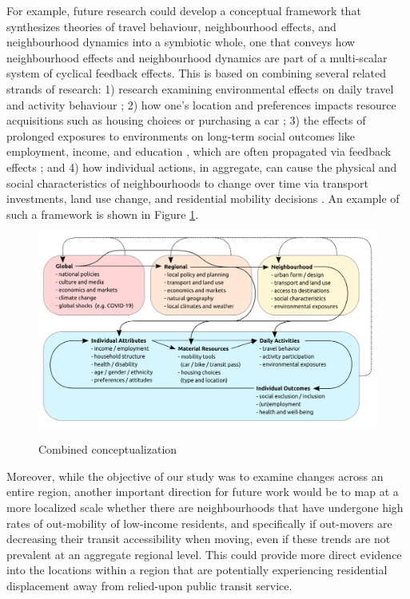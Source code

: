 For example, future research could develop a conceptual framework that synthesizes theories of travel behaviour, neighbourhood effects, and neighbourhood dynamics into a symbiotic whole, one that conveys how neighbourhood effects and neighbourhood dynamics are part of a multi-scalar system of cyclical feedback effects. This is based on combining several related strands of research: 1) research examining environmental effects on daily travel and activity behaviour \cite{hanson_determinants_1982,ewing_travel_2010}; 2) how one's location and preferences impacts resource acquisitions such as housing choices or purchasing a car \cite{lee_neighborhood_1994,klein_millennials_2017}; 3) the effects of prolonged exposures to environments on long-term social outcomes like employment, income, and education \cite{sampson_assessing_2002,chetty_effects_2016}, which are often propagated via feedback effects \cite{wilson_truly_2012,lucas_transport_2012}; and 4) how individual actions, in aggregate, can cause the physical and social characteristics of neighbourhoods to change over time via transport investments, land use change, and residential mobility decisions \cite{wegener_land-use_2004,wilson_truly_2012,van_ham_understanding_2013}. An example of such a framework is shown in Figure \ref{fig:conceptual}.

\begin{figure}[H]
	\caption{{Combined conceptualization}}
	\includegraphics[width=6in]{figures/my_idea.png}
	\centering
	\label{fig:conceptual}
\end{figure}


Moreover, while the objective of our study was to examine changes across an entire region, another important direction for future work would be to map at a more localized scale whether there are neighbourhoods that have undergone high rates of out-mobility of low-income residents, and specifically if out-movers are decreasing their transit accessibility when moving, even if these trends are not prevalent at an aggregate regional level. This could provide more direct evidence into the locations within a region that are potentially experiencing residential displacement away from relied-upon public transit service.

